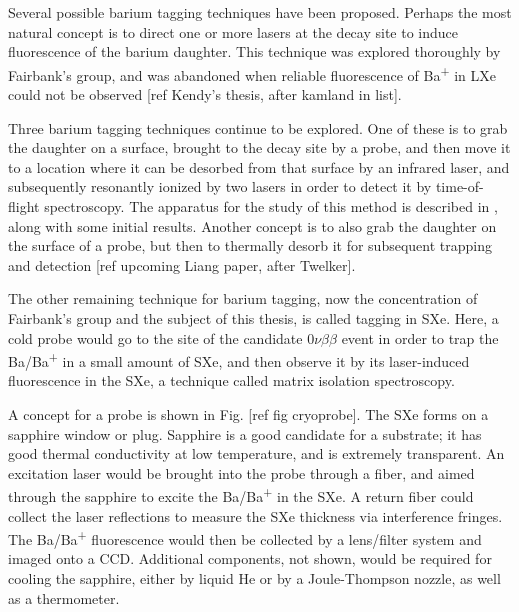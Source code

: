 Several possible barium tagging techniques have been proposed.  Perhaps the most natural concept is to direct one or more lasers at the decay site to induce fluorescence of the barium daughter.  This technique was explored thoroughly by Fairbank's group, and was abandoned when reliable fluorescence of Ba\textsuperscript{+} in LXe could not be observed [ref Kendy's thesis, after kamland in list].


Three barium tagging techniques continue to be explored.  One of these is to grab the daughter on a surface, brought to the decay site by a probe, and then move it to a location where it can be desorbed from that surface by an infrared laser, and subsequently resonantly ionized by two lasers in order to detect it by time-of-flight spectroscopy.  The apparatus for the study of this method is described in \cite{Twelker2014}, along with some initial results.  Another concept is to also grab the daughter on the surface of a probe, but then to thermally desorb it for subsequent trapping and detection [ref upcoming Liang paper, after Twelker].

The other remaining technique for barium tagging, now the concentration of Fairbank's group and the subject of this thesis, is called tagging in SXe.  Here, a cold probe would go to the site of the candidate $0\nu\beta\beta$ event in order to trap the Ba/Ba\textsuperscript{+} in a small amount of SXe, and then observe it by its laser-induced fluorescence in the SXe, a technique called matrix isolation spectroscopy.

A concept for a probe is shown in Fig. [ref fig cryoprobe].  The SXe forms on a sapphire window or plug.  Sapphire is a good candidate for a substrate; it has good thermal conductivity at low temperature, and is extremely transparent.  An excitation laser would be brought into the probe through a fiber, and aimed through the sapphire to excite the Ba/Ba\textsuperscript{+} in the SXe.  A return fiber could collect the laser reflections to measure the SXe thickness via interference fringes.  The Ba/Ba\textsuperscript{+} fluorescence would then be collected by a lens/filter system and imaged onto a CCD.  Additional components, not shown, would be required for cooling the sapphire, either by liquid He or by a Joule-Thompson nozzle, as well as a thermometer.

